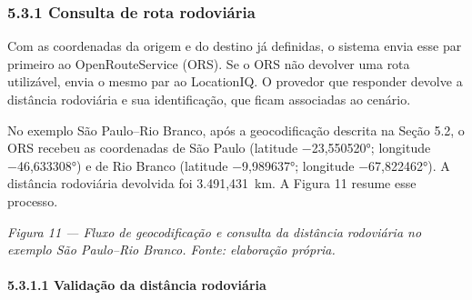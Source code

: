 \documentclass[brazil,]{article}
\let\oldsubsubsection\subsubsection
\renewcommand{\subsubsection}{\Needspace{10\baselineskip}\oldsubsubsection}
\let\oldparagraph\paragraph
\renewcommand{\paragraph}[1]{\Needspace{7\baselineskip}\oldparagraph{#1}\mbox{}}
\begin{document}
\hypertarget{consulta-de-rota-rodoviuxe1ria}{%
\subsubsection{5.3.1 Consulta de rota
rodoviária}\label{consulta-de-rota-rodoviuxe1ria}}

Com as coordenadas da origem e do destino já definidas, o sistema envia
esse par primeiro ao OpenRouteService (ORS). Se o ORS não devolver uma
rota utilizável, envia o mesmo par ao LocationIQ. O provedor que
responder devolve a distância rodoviária e sua identificação, que ficam
associadas ao cenário.

No exemplo São Paulo--Rio Branco, após a geocodificação descrita na
Seção 5.2, o ORS recebeu as coordenadas de São Paulo (latitude
−23,550520°; longitude −46,633308°) e de Rio Branco (latitude
−9,989637°; longitude −67,822462°). A distância rodoviária devolvida foi
3.491,431~km. A Figura 11 resume esse processo.

\begin{center}
\end{center}

\emph{Figura 11 --- Fluxo de geocodificação e consulta da distância
rodoviária no exemplo São Paulo--Rio Branco. Fonte: elaboração própria.}

\hypertarget{validauxe7uxe3o-da-distuxe2ncia-rodoviuxe1ria}{%
\paragraph{5.3.1.1 Validação da distância
rodoviária}\label{validauxe7uxe3o-da-distuxe2ncia-rodoviuxe1ria}}
\end{document}
